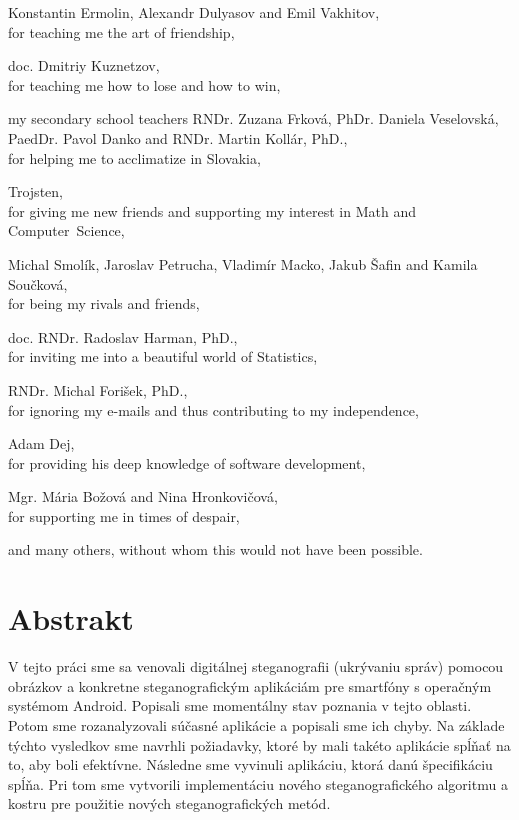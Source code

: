\documentclass[12pt, oneside]{book}
\def\ack#1#2{#1,\\#2\smallskip}
\begin{document}
\ack{Konstantin Ermolin, Alexandr Dulyasov and Emil Vakhitov}{for teaching me the art of friendship,}

\ack{doc. Dmitriy Kuznetzov}{for teaching me how to lose and how to win,}

\ack{my secondary school teachers RNDr. Zuzana Frková, PhDr. Daniela Veselovská, PaedDr. Pavol Danko and RNDr. Martin Kollár, PhD.}
{for helping me to acclimatize in Slovakia,}

\ack{Trojsten}{for giving me new friends and supporting my interest in Math and Computer~Science,}

\ack{Michal Smolík, Jaroslav Petrucha, Vladimír Macko, Jakub Šafin and Kamila Součková}{for being
my rivals and friends,}

\ack{doc. RNDr. Radoslav Harman, PhD.}{for inviting me into a beautiful world of Statistics,}

\ack{RNDr. Michal Forišek, PhD.}{for ignoring my e-mails and thus contributing to my independence,}

\ack{Adam Dej}{for providing his deep knowledge of software development,}

\ack{Mgr. Mária Božová and Nina Hronkovičová}{for supporting me in times of despair,}

and many others, without whom this would not have been possible.

\vfill


\newpage 
\section*{Abstrakt}

V tejto práci sme sa venovali digitálnej steganografii (ukrývaniu správ) pomocou obrázkov 
a konkretne steganografickým aplikáciám pre smartfóny s operačným systémom Android. 
Popisali sme momentálny stav poznania v tejto oblasti. 
Potom sme rozanalyzovali súčasné aplikácie
a popisali sme ich chyby. Na základe týchto vysledkov sme navrhli 
požiadavky, ktoré by mali takéto aplikácie spĺňať na to, aby boli efektívne. Následne
sme vyvinuli aplikáciu, ktorá danú špecifikáciu spĺňa. 
Pri tom sme vytvorili implementáciu nového steganografického algoritmu a kostru
pre použitie nových steganografických metód.
\end{document}
